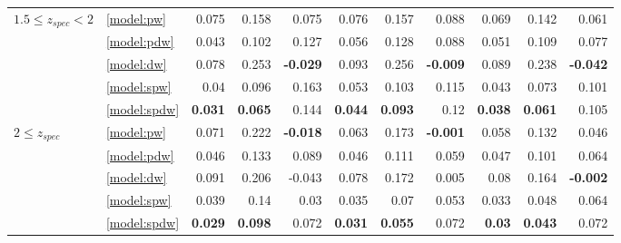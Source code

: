 \documentclass[fleqn,usenatbib]{mnras}
\begin{document}
\begin{table}
\begin{tabular}{llrrrrrrrrr}
\hline
            $1.5 \leq z_{spec} < 2$ & \ref{model:pw} &                0.075 &           0.158 &            0.075 &            0.076 &           0.157 &            0.088 &            0.069 &           0.142 &            0.061 \\
                              & \ref{model:pdw} &                0.043 &           0.102 &            0.127 &            0.056 &           0.128 &            0.088 &            0.051 &           0.109 &            0.077 \\
                              & \ref{model:dw} &                0.078 &           0.253 &  \textbf{-0.029} &            0.093 &           0.256 &  \textbf{-0.009} &            0.089 &           0.238 &  \textbf{-0.042} \\
                              & \ref{model:spw} &                 0.04 &           0.096 &            0.163 &            0.053 &           0.103 &            0.115 &            0.043 &           0.073 &            0.101 \\
                              & \ref{model:spdw} &       \textbf{0.031} &  \textbf{0.065} &            0.144 &   \textbf{0.044} &  \textbf{0.093} &             0.12 &   \textbf{0.038} &  \textbf{0.061} &            0.105 \\
\hline
            $2 \leq z_{spec}$ & \ref{model:pw} &                0.071 &           0.222 &  \textbf{-0.018} &            0.063 &           0.173 &  \textbf{-0.001} &            0.058 &           0.132 &            0.046 \\
                              & \ref{model:pdw} &                0.046 &           0.133 &            0.089 &            0.046 &           0.111 &            0.059 &            0.047 &           0.101 &            0.064 \\
                              & \ref{model:dw} &                0.091 &           0.206 &           -0.043 &            0.078 &           0.172 &            0.005 &             0.08 &           0.164 &  \textbf{-0.002} \\
                              & \ref{model:spw} &                0.039 &            0.14 &             0.03 &            0.035 &            0.07 &            0.053 &            0.033 &           0.048 &            0.064 \\
                              & \ref{model:spdw} &       \textbf{0.029} &  \textbf{0.098} &            0.072 &   \textbf{0.031} &  \textbf{0.055} &            0.072 &    \textbf{0.03} &  \textbf{0.043} &            0.072 \\

\end{tabular}
\end{table}
\end{document}
